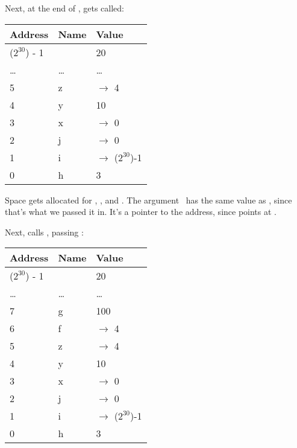 \blank

Next, at the end of ,  gets called:

\begin{table}[H]
  \begin{tabular}{|l|l|l|}
    \hline
    \textbf{Address} & \textbf{Name} & \textbf{Value} \\
    \hline
    ($2^{30}$) - 1 & & 20 \\
    \hline
    \ldots & \ldots & \ldots \\
    \hline
    5 & z & $\rightarrow$ 4 \\
    \hline
    4 & y & 10 \\
    \hline
    3 & x & $\rightarrow$ 0 \\
    \hline
    2 & j & $\rightarrow$ 0 \\
    \hline
    1 & i & $\rightarrow$ ($2^{30}$)-1 \\
    \hline
    0 & h & 3 \\
    \hline
  \end{tabular}
\end{table}

Space gets allocated for \x, \y, and \z. The argument \x\ has the same value as , since that's what we passed it in. It's 
a pointer to the  address, since  points at .

\blank

Next,  calls , passing \z:

\begin{table}[H]
  \begin{tabular}{|l|l|l|}
    \hline
    \textbf{Address} & \textbf{Name} & \textbf{Value} \\
    \hline
    ($2^{30}$) - 1 & & 20 \\
    \hline
    \ldots & \ldots & \ldots \\
    \hline
    7 & g & 100 \\
    \hline
    6 & f & $\rightarrow$ 4 \\
    \hline
    5 & z & $\rightarrow$ 4 \\
    \hline
    4 & y & 10 \\
    \hline
    3 & x & $\rightarrow$ 0 \\
    \hline
    2 & j & $\rightarrow$ 0 \\
    \hline
    1 & i & $\rightarrow$ ($2^{30}$)-1 \\
    \hline
    0 & h & 3 \\
    \hline
  \end{tabular}
\end{table}

